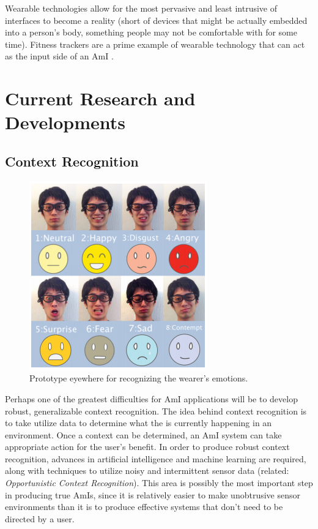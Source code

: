 \documentclass{article}
\begin{document}
Wearable technologies allow for the most pervasive and least intrusive of interfaces to become a reality (short of devices that might be actually embedded into a person's body, something people may not be comfortable with for some time). Fitness trackers are a prime example of wearable technology that can act as the input side of an AmI \cite{Cook2009277}.

%
%
\section{Current Research and Developments}

%
\subsection{Context Recognition}

\begin{figure}
  \begin{center}
    \includegraphics[width=.8\linewidth]{emotion_eyewear}
  \end{center}
  \caption{Prototype eyewhere for recognizing the wearer's emotions. \cite{7390646}}
  \label{emotion-eyewear}
\end{figure}

Perhaps one of the greatest difficulties for AmI applications will be to develop robust, generalizable context recognition. The idea behind context recognition is to take utilize data to determine what the is currently happening in an environment. Once a context can be determined, an AmI system can take appropriate action for the user's benefit. \cite{Cook2009277} In order to produce robust context recognition, advances in artificial intelligence and machine learning are required, along with techniques to utilize noisy and intermittent sensor data \cite{Sadri:2011:AIS:1978802.1978815} (related: \emph{Opportunistic Context Recognition}). This area is possibly the most important step in producing true AmIs, since it is relatively easier to make unobtrusive sensor environments than it is to produce effective systems that don't need to be directed by a user.
\end{document}
